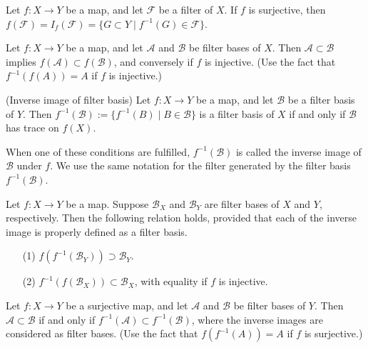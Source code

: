 \documentclass{article}
\begin{document}
\begin{exe}
    Let \( f:X \to Y \) be a map, and let \( \mathscr{F} \) be a filter of \( X \). If \( f \) is surjective, then \( f(\mathscr{F}) = I_f(\mathscr{F}) = \{G \subset Y \mid f^{-1}(G) \in \mathscr{F}\} \).
\end{exe}

\begin{exe}
    Let \( f:X \to Y \) be a map, and let \( \mathscr{A} \) and \( \mathscr{B} \) be filter bases of \( X \). Then \( \mathscr{A} \subset \mathscr{B} \) implies \( f(\mathscr{A}) \subset f(\mathscr{B}) \), and conversely if \( f \) is injective. (Use the fact that \( f^{-1}(f(A)) =A \) if \( f \) is injective.)
\end{exe}

\begin{exe}\label{inverse image of filter} (Inverse image of filter basis)
    Let \( f:X \to Y \) be a map, and let \( \mathscr{B} \) be a filter basis of \( Y \). Then \( f^{-1}(\mathscr{B}):=\{f^{-1}(B) \mid B \in \mathscr{B}\} \) is a filter basis of \( X \) if and only if \( \mathscr{B} \) has trace on \( f(X) \).

    When one of these conditions are fulfilled, \( f^{-1}(\mathscr{B}) \) is called the inverse image of \( \mathscr{B} \) under \( f \). We  use the same notation for the filter generated by the filter basis \( f^{-1}(\mathscr{B}) \).
\end{exe}

\begin{exe}\label{double mapping}
    Let \( f:X \to Y \) be a map. Suppose \( \mathscr{B}_X \) and \( \mathscr{B}_Y \) are filter bases of \( X \) and \( Y \), respectively.
    Then the following relation holds, provided that each of the inverse image is properly defined as a filter basis.
    \begin{itemize}
        \item[(1)] \( f(f^{-1}(\mathscr{B}_Y)) \supset \mathscr{B}_Y \).
        \item[(2)] \( f^{-1}(f(\mathscr{B}_X)) \subset  \mathscr{B}_X \), with equality if \( f \) is injective.
    \end{itemize}
\end{exe}

\begin{exe}\label{inverse image preserve order}
    Let \( f:X \to Y \) be a surjective map, and let \( \mathscr{A} \) and \( \mathscr{B} \) be filter bases of \( Y \). Then \( \mathscr{A} \subset \mathscr{B} \) if and only if \( f^{-1}(\mathscr{A}) \subset f^{-1}(\mathscr{B}) \), where the inverse images are considered as filter bases. (Use the fact that \( f(f^{-1}(A)) =A \) if \( f \) is surjective.)
\end{exe}
\end{document}
